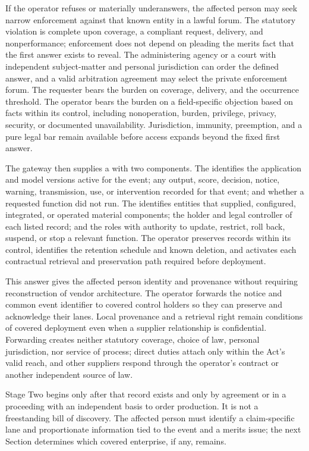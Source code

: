 If the operator refuses or materially underanswers, the affected person may seek narrow enforcement against that known entity in a lawful forum. The statutory violation is complete upon coverage, a compliant request, delivery, and nonperformance; enforcement does not depend on pleading the merits fact that the first answer exists to reveal. The administering agency or a court with independent subject-matter and personal jurisdiction can order the defined answer, and a valid arbitration agreement may select the private enforcement forum. The requester bears the burden on coverage, delivery, and the occurrence threshold. The operator bears the burden on a field-specific objection based on facts within its control, including nonoperation, burden, privilege, privacy, security, or documented unavailability. Jurisdiction, immunity, preemption, and a pure legal bar remain available before access expands beyond the fixed first answer.

The gateway then supplies a  with two components. The  identifies the application and model versions active for the event; any output, score, decision, notice, warning, transmission, use, or intervention recorded for that event; and whether a requested function did not run. The  identifies entities that supplied, configured, integrated, or operated material components; the holder and legal controller of each listed record; and the roles with authority to update, restrict, roll back, suspend, or stop a relevant function. The operator preserves records within its control, identifies the retention schedule and known deletion, and activates each contractual retrieval and preservation path required before deployment.

This answer gives the affected person identity and provenance without requiring reconstruction of vendor architecture. The operator forwards the notice and common event identifier to covered control holders so they can preserve and acknowledge their lanes. Local provenance and a retrieval right remain conditions of covered deployment even when a supplier relationship is confidential. Forwarding creates neither statutory coverage, choice of law, personal jurisdiction, nor service of process; direct duties attach only within the Act's valid reach, and other suppliers respond through the operator's contract or another independent source of law.

Stage Two begins only after that record exists and only by agreement or in a proceeding with an independent basis to order production. It is not a freestanding bill of discovery. The affected person must identify a claim-specific lane and proportionate information tied to the event and a merits issue; the next Section determines which covered enterprise, if any, remains.

